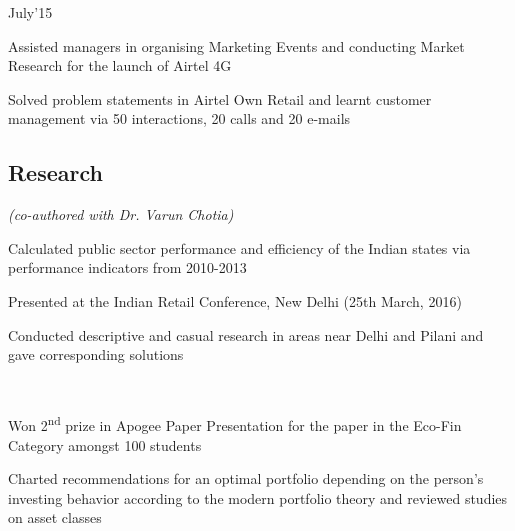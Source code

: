 \documentclass[]{deedy-resume-openfont}
\begin{document}
\begin{minipage}[t]{0.66\textwidth}
\descript{|}
\hfill July'15\\
\begin{tightemize}
\item Assisted managers in organising Marketing Events and conducting Market Research for the launch of Airtel 4G
\item Solved problem statements in Airtel Own Retail and learnt customer management via 50 interactions, 20 calls and 20 e-mails
\end{tightemize}
\sectionsep


\subsection{Research}

\emph{(co-authored with Dr. Varun Chotia)}
\begin{tightemize}
\item Calculated public sector performance and efficiency of the Indian states via performance indicators from 2010-2013
\end{tightemize}
\vspace{0.5em}

\begin{tightemize}
\item Presented at the Indian Retail Conference, New Delhi (25th March, 2016)
\item Conducted descriptive and casual research in areas near Delhi and Pilani and gave corresponding solutions
\end{tightemize}
\vspace{0.5em}

\\
\begin{tightemize}
\item Won 2\textsuperscript{nd} prize in Apogee Paper Presentation for the paper in the Eco-Fin Category amongst 100 students
\item Charted recommendations for an optimal portfolio depending on the person’s investing behavior according to the modern portfolio theory and reviewed studies on asset classes
\end{tightemize}
\sectionsep


\end{minipage}
\end{document}
